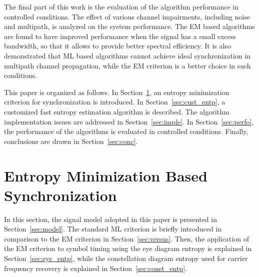 \documentclass[12pt, draftclsnofoot, onecolumn]{IEEEtran}
\begin{document}
The final part of this work is the evaluation of the  algorithm performance in controlled conditions. 
The effect of various channel impairments, including noise and multipath, is analyzed on the system performance.  
The EM based algorithms are found to have improved performance when the signal has a small excess bandwidth, so that it allows to provide better spectral efficiency.
It is also demonstrated that ML based algorithms cannot achieve ideal synchronization in multipath channel propagation, while the EM criterion is a better choice in such conditions. 



This paper is organized as follows.
In Section~\ref{sec:entropy},
an entropy minimization criterion for synchronization is introduced. 
In Section~\ref{sec:cust_entp}, a customized fast entropy estimation algorithm is described. 
The algorithm implementation issues are addressed in Section~\ref{sec:imple}.
In Section~\ref{sec:perfo}, the performance of the algorithms is evaluated in controlled conditions.
Finally, conclusions are drawn in Section~\ref{sec:conc}.

\section{Entropy Minimization Based Synchronization}
\label{sec:entropy}
In this section, the signal model adopted in this paper is presented in Section~\ref{sec:model}.
The standard ML criterion is briefly introduced in comparison to the EM criterion in Section~\ref{sec:versus}.
Then, the application of the EM criterion to symbol timing using the eye diagram entropy is explained in Section~\ref{sec:eye_entp},
while the constellation diagram entropy used for carrier frequency recovery is explained in Section~\ref{sec:const_entp}.
\end{document}
